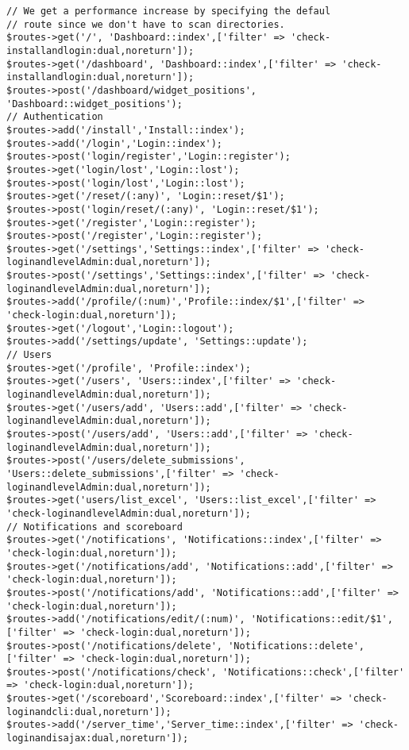 \begin{lstlisting}[caption=Penambahan \textit{routes} yang digunakan pada aplikasi \textit{SharIF Judge}, label=kode:routesbab4]
// We get a performance increase by specifying the defaul
// route since we don't have to scan directories.
$routes->get('/', 'Dashboard::index',['filter' => 'check-installandlogin:dual,noreturn']);
$routes->get('/dashboard', 'Dashboard::index',['filter' => 'check-installandlogin:dual,noreturn']);
$routes->post('/dashboard/widget_positions', 'Dashboard::widget_positions');
// Authentication
$routes->add('/install','Install::index');
$routes->add('/login','Login::index');
$routes->post('login/register','Login::register');
$routes->get('login/lost','Login::lost');
$routes->post('login/lost','Login::lost');
$routes->get('/reset/(:any)', 'Login::reset/$1');
$routes->post('login/reset/(:any)', 'Login::reset/$1');
$routes->get('/register','Login::register');
$routes->post('/register','Login::register');
$routes->get('/settings','Settings::index',['filter' => 'check-loginandlevelAdmin:dual,noreturn']);
$routes->post('/settings','Settings::index',['filter' => 'check-loginandlevelAdmin:dual,noreturn']);
$routes->add('/profile/(:num)','Profile::index/$1',['filter' => 'check-login:dual,noreturn']);
$routes->get('/logout','Login::logout');
$routes->add('/settings/update', 'Settings::update');
// Users
$routes->get('/profile', 'Profile::index');
$routes->get('/users', 'Users::index',['filter' => 'check-loginandlevelAdmin:dual,noreturn']);
$routes->get('/users/add', 'Users::add',['filter' => 'check-loginandlevelAdmin:dual,noreturn']);
$routes->post('/users/add', 'Users::add',['filter' => 'check-loginandlevelAdmin:dual,noreturn']);
$routes->post('/users/delete_submissions', 'Users::delete_submissions',['filter' => 'check-loginandlevelAdmin:dual,noreturn']);
$routes->get('users/list_excel', 'Users::list_excel',['filter' => 'check-loginandlevelAdmin:dual,noreturn']);
// Notifications and scoreboard
$routes->get('/notifications', 'Notifications::index',['filter' => 'check-login:dual,noreturn']);
$routes->get('/notifications/add', 'Notifications::add',['filter' => 'check-login:dual,noreturn']);
$routes->post('/notifications/add', 'Notifications::add',['filter' => 'check-login:dual,noreturn']);
$routes->add('/notifications/edit/(:num)', 'Notifications::edit/$1',['filter' => 'check-login:dual,noreturn']);
$routes->post('/notifications/delete', 'Notifications::delete',['filter' => 'check-login:dual,noreturn']);
$routes->post('/notifications/check', 'Notifications::check',['filter' => 'check-login:dual,noreturn']);
$routes->get('/scoreboard','Scoreboard::index',['filter' => 'check-loginandcli:dual,noreturn']);
$routes->add('/server_time','Server_time::index',['filter' => 'check-loginandisajax:dual,noreturn']);

\end{lstlisting}
